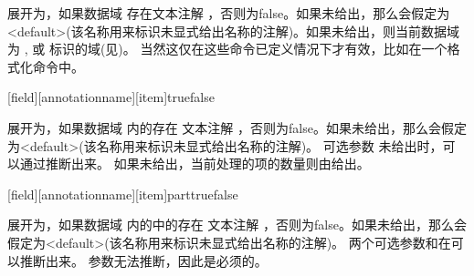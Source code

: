 \begin{ltxsyntax}

展开为，如果数据域  存在文本注解 ，否则为false。如果未给出，那么会假定为<default>(该名称用来标识未显式给出名称的注解)。如果未给出，则当前数据域为 ,  或 标识的域(见)。 当然这仅在这些命令已定义情况下才有效，比如在一个格式化命令中。

[field][annotationname][item]{true}{false}


展开为，如果数据域  内的存在
文本注解 ，否则为false。如果未给出，那么会假定为<default>(该名称用来标识未显式给出名称的注解)。
可选参数 未给出时，可以通过推断出来。
如果未给出，当前处理的项的数量则由给出。

[field][annotationname][item]{part}{true}{false}


展开为，如果数据域  内的中的存在
文本注解 ，否则为false。如果未给出，那么会假定为<default>(该名称用来标识未显式给出名称的注解)。
两个可选参数和在可以推断出来。
 参数无法推断，因此是必须的。


\end{ltxsyntax}
